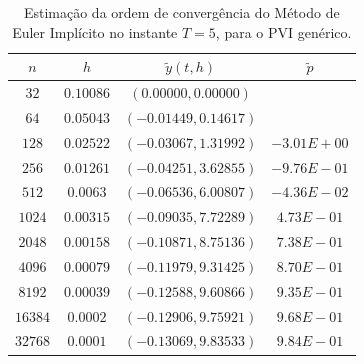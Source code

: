 \documentclass[twocolumn,amsmath,amssymb,floatfix]{revtex4}
\begin{document}
\begin{table}[H]
 \centering
 \begin{tabular}{ c|c|c|c }
  \hline
  \hline
  $n$  & $h$  & $\tilde{y}(t,h)$ & $\tilde{p}$ \\
  \hline
  \hline
$32$&$0.10086$&	$    (   0.00000,    0.00000)$ &	$ $ \\
\hline
$64$&$0.05043$&$   (  -0.01449,    0.14617)$&$ $\\
\hline
$128$&$0.02522	 $&$    (  -0.03067,    1.31992)	$&$-3.01E+00$\\
\hline
$256$&$0.01261	 $&$  (  -0.04251,    3.62855)	$&$-9.76E-01$\\
\hline
$512$&$0.0063	 $&$    (  -0.06536,    6.00807)$&$-4.36E-02$\\
\hline
$1024$&$0.00315	 $&$    (  -0.09035,    7.72289)	$&$4.73E-01$\\
\hline
$2048$&$0.00158	 $&$    (  -0.10871,    8.75136)	$&$7.38E-01$\\
\hline
$4096$&$0.00079	 $&$    (  -0.11979,    9.31425)	$&$8.70E-01$\\
\hline
$8192$&$0.00039	 $&$    (  -0.12588,    9.60866)	$&$9.35E-01$\\
\hline
$16384$&$0.0002	 $&$    (  -0.12906,    9.75921)	$&$9.68E-01$\\
\hline
$32768$&$0.0001	 $&$   (  -0.13069,    9.83533)	$&$9.84E-01$\\
  \hline
  \hline
 \end{tabular}
   \caption{Estimação da ordem de convergência do Método de Euler Implícito no instante $T=5$, para o PVI genérico.} \label{tab:c2m2t5}
\end{table}
\end{document}

